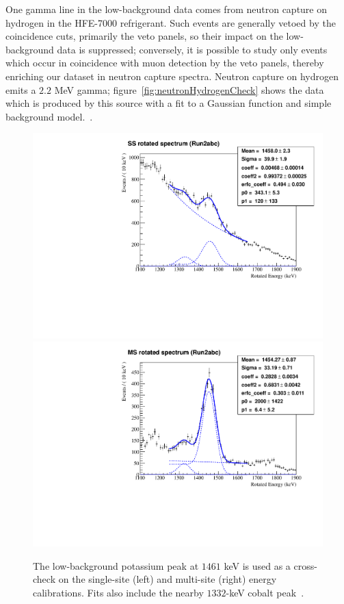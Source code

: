 One gamma line in the low-background data comes from neutron capture on hydrogen in the HFE-7000 refrigerant.  Such events are generally vetoed by the coincidence cuts, primarily the veto panels, so their impact on the low-background data is suppressed; conversely, it is possible to study only events which occur in coincidence with muon detection by the veto panels, thereby enriching our dataset in neutron capture spectra.  Neutron capture on hydrogen emits a $2.2$ MeV gamma; figure~\ref{fig:neutronHydrogenCheck} shows the data which is produced by this source with a fit to a Gaussian function and simple background model.~\cite{NeutronCaptureGammas,EnergyDocumentRun2ab}.

\begin{figure}
\begin{center}
\includegraphics[keepaspectratio=true,width=.49\textwidth]{EXO_Workspace_Run2abc_K40_ss_1250keVto1650keV.pdf}
\includegraphics[keepaspectratio=true,width=.49\textwidth]{EXO_Workspace_Run2abc_K40_ms_1250keVto1650keV.pdf}
\end{center}
\renewcommand{\baselinestretch}{1}
\small\normalsize
\begin{quote}
\caption{The low-background potassium peak at $1461$ keV is used as a cross-check on the single-site (left) and multi-site (right) energy calibrations.  Fits also include the nearby $1332$-keV cobalt peak~\cite{EnergyDocumentRun2ab}.}
\label{fig:PotassiumPeakCheck}
\end{quote}
\end{figure}
\renewcommand{\baselinestretch}{2}
\small\normalsize

